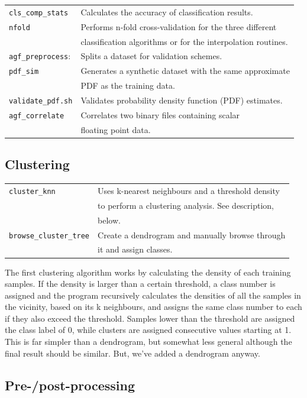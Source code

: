 \documentclass[12pt]{article}
\begin{document}
\begin{tabular}{ll}
\verb/cls_comp_stats/ &	Calculates the accuracy of classification results.\\
\verb/nfold/ &	Performs n-fold cross-validation for the three different \\
		    & classification algorithms or for the interpolation routines.\\
\verb/agf_preprocess/: & Splits a dataset for validation schemes.\\
\verb/pdf_sim/ & Generates a synthetic dataset with the same approximate \\
		      & PDF as the training data.\\
\verb/validate_pdf.sh/ & Validates probability density function (PDF) estimates.\\
\verb/agf_correlate/ & Correlates two binary files containing scalar \\
			    & floating point data.
\end{tabular}

\subsection{Clustering}

\begin{tabular}{ll}
  \verb/cluster_knn/ & Uses k-nearest neighbours and a threshold density\\
		     & to perform a clustering analysis.  See description, \\
	      & below.\\
  \verb/browse_cluster_tree/ &Create a dendrogram and manually browse through\\
		    & it and assign classes.
\end{tabular}

  The first clustering algorithm works by calculating the density of each training samples.  If the density is larger than a certain threshold, a class number is assigned and the program recursively calculates the densities of all the samples in the vicinity, based on its k neighbours, and assigns the same class number to each if they also exceed the threshold.  Samples lower than the threshold are assigned the class label of 0, while clusters are assigned consecutive values starting at 1.  This is far simpler than a dendrogram, but somewhat less general although the final result should be similar.  But, we've added a dendrogram anyway.

\subsection{Pre-/post-processing}
\end{document}
